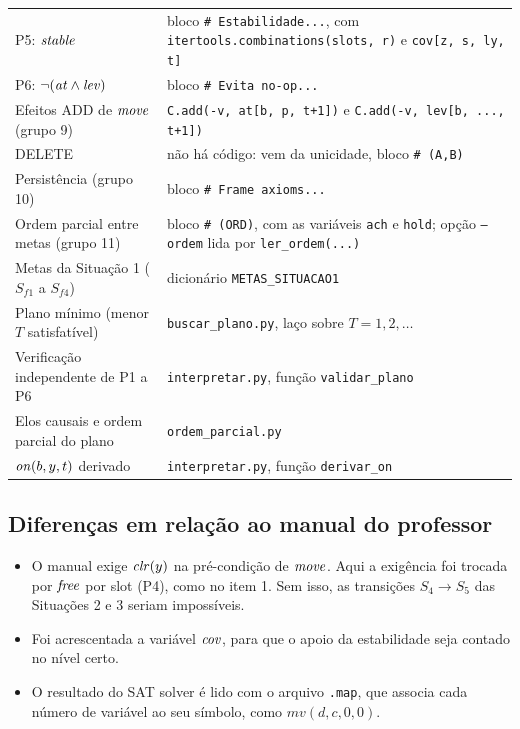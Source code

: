 \begin{longtable}{p{5.2cm} p{9.6cm}}
P5: $\mathit{stable}$ & bloco \lstinline|# Estabilidade...|, com \lstinline|itertools.combinations(slots, r)| e \lstinline|cov[z, s, ly, t]| \\
P6: $\neg(\mathit{at}\land\mathit{lev})$ & bloco \lstinline|# Evita no-op...| \\
Efeitos ADD de $\mathit{move}$ (grupo 9) & \lstinline|C.add(-v, at[b, p, t+1])| e \lstinline|C.add(-v, lev[b, ..., t+1])| \\
DELETE & não há código: vem da unicidade, bloco \lstinline|# (A,B)| \\
Persistência (grupo 10) & bloco \lstinline|# Frame axioms...| \\
Ordem parcial entre metas (grupo 11) & bloco \lstinline|# (ORD)|, com as variáveis \lstinline|ach| e \lstinline|hold|; opção \texttt{--ordem} lida por \lstinline|ler_ordem(...)| \\
Metas da Situação 1 ($S_{f1}$ a $S_{f4}$) & dicionário \lstinline|METAS_SITUACAO1| \\
Plano mínimo (menor $T$ satisfatível) & \texttt{buscar\_plano.py}, laço sobre $T=1,2,\dots$ \\
Verificação independente de P1 a P6 & \texttt{interpretar.py}, função \texttt{validar\_plano} \\
Elos causais e ordem parcial do plano & \texttt{ordem\_parcial.py} \\
$\mathit{on}(b,y,t)$ derivado & \texttt{interpretar.py}, função \texttt{derivar\_on} \\
\bottomrule
\end{longtable}

\subsection{Diferenças em relação ao manual do professor}
\begin{itemize}
\item O manual exige $\mathit{clr}(y)$ na pré-condição de $\mathit{move}$. Aqui a exigência foi trocada por $\mathit{free}$ por slot (P4), como no item 1. Sem isso, as transições $S_4\to S_5$ das Situações 2 e 3 seriam impossíveis.
\item Foi acrescentada a variável $\mathit{cov}$, para que o apoio da estabilidade seja contado no nível certo.
\item O resultado do SAT solver é lido com o arquivo \texttt{.map}, que associa cada número de variável ao seu símbolo, como $\mathit{mv}(d,c,0,0)$.
\end{itemize}
